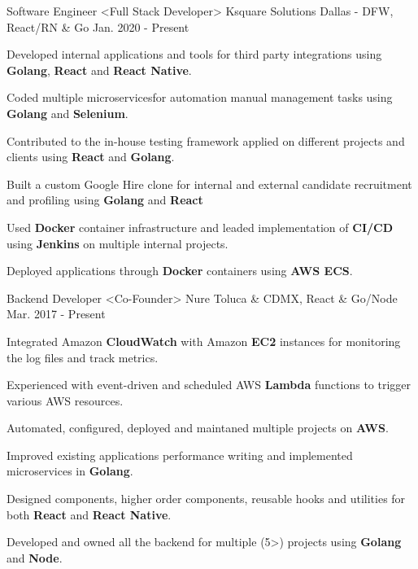 \begin{cventries}
  \cventry
    {Software Engineer <Full Stack Developer>}
    {Ksquare Solutions}
    {Dallas - DFW, React/RN \& Go}
    {Jan. 2020 - Present}
    {
      \begin{cvitems}
        \item {Developed internal applications and tools for third party integrations using \textbf{Golang}, \textbf{React} and \textbf{React Native}.}
        \item {Coded multiple microservicesfor automation manual management tasks using \textbf{Golang} and \textbf{Selenium}.}
        \item {Contributed to the in-house testing framework applied on different projects and clients using \textbf{React} and \textbf{Golang}.}
        \item {Built a custom Google Hire clone for internal and external candidate recruitment and profiling using \textbf{Golang} and \textbf{React}}
        \item {Used \textbf{Docker} container infrastructure and leaded implementation of \textbf{CI/CD} using \textbf{Jenkins} on multiple internal projects.}
        \item {Deployed applications through \textbf{Docker} containers using \textbf{AWS ECS}.}
      \end{cvitems}
    }
  \cventry
    {Backend Developer <Co-Founder>}
    {Nure}
    {Toluca \& CDMX, React \& Go/Node}
    {Mar. 2017 - Present}
    {
      \begin{cvitems}
        \item {Integrated Amazon \textbf{CloudWatch} with Amazon \textbf{EC2} instances for monitoring the log files and track metrics.}
        \item {Experienced with event-driven and scheduled AWS \textbf{Lambda} functions to trigger various AWS resources.}
        \item {Automated, configured, deployed and maintaned multiple projects on \textbf{AWS}.}
        \item {Improved existing applications performance writing and implemented microservices in \textbf{Golang}.}
        \item {Designed components, higher order components, reusable hooks and utilities for both \textbf{React} and \textbf{React Native}.}
        \item {Developed and owned all the backend for multiple (5>) projects using \textbf{Golang} and \textbf{Node}.}

\end{cvitems}}
\end{cventries}
